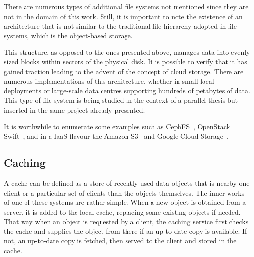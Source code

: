 There are numerous types of additional file systems not mentioned since they are not in the domain of this work. Still, it is important to note the existence of an architecture that is not similar to the traditional file hierarchy adopted in file systems, which is the object-based storage. 

This structure, as opposed to the ones presented above, manages data into evenly sized blocks within sectors of the physical disk. It is possible to verify that it has gained traction leading to the advent of the concept of cloud storage. There are numerous implementations of this architecture, whether in small local deployments or large-scale data centres supporting hundreds of petabytes of data.
This type of file system is being studied in the context of a parallel thesis but inserted in the same project already presented.

It is worthwhile to enumerate some examples such as CephFS~\cite{Weil2006}, OpenStack Swift~\cite{Swift2017}, and in a IaaS flavour the Amazon S3~\cite{aws_s3} and Google Cloud Storage~\cite{gcp_storage}.









\subsection{Caching} %
\label{sub:caching}

A cache can be defined as a store of recently used data objects that is nearby one client or a particular set of clients than the objects themselves. The inner works of one of these systems are rather simple. When a new object is obtained from a server, it is added to the local cache, replacing some existing objects if needed. That way when an object is requested by a client, the caching service first checks the cache and supplies the object from there if an up-to-date copy is available. If not, an up-to-date copy is fetched, then served to the client and stored in the cache. 

